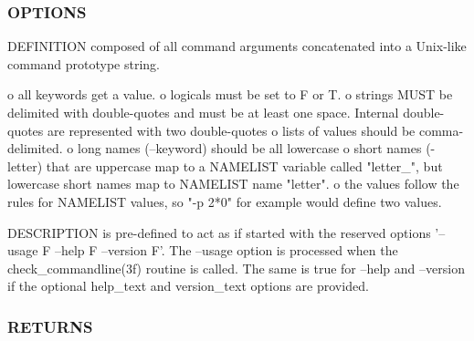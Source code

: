 \subsubsection*{O\+P\+T\+I\+O\+NS}

\begin{DoxyVerb}  DEFINITION    composed of all command arguments concatenated
                into a Unix-like command prototype string.

                o all keywords get a value.
                o logicals must be set to F or T.
                o strings MUST be delimited with double-quotes and
                  must be at least one space. Internal
                  double-quotes are represented with two double-quotes
                o lists of values should be comma-delimited.
                o long names (--keyword) should be all lowercase
                o short names (-letter) that are uppercase map to a
                  NAMELIST variable called "letter_", but lowercase
                  short names map to NAMELIST name "letter".
                o the values follow the rules for NAMELIST values, so
                  "-p 2*0" for example would define two values.

                DESCRIPTION is pre-defined to act as if started with the reserved
                options '--usage F --help F --version F'. The --usage
                option is processed when the check_commandline(3f)
                routine is called. The same is true for --help and --version
                if the optional help_text and version_text options are
                provided.
\end{DoxyVerb}
 \subsubsection*{R\+E\+T\+U\+R\+NS}

